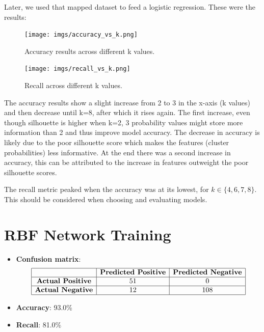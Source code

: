 \documentclass[a4paper,12pt]{article}
\begin{document}
Later, we used that mapped dataset to feed a logistic regression. These were the results:

\begin{figure}[H]
    \centering
    \begin{minipage}{0.48\textwidth}
        \centering
        \texttt{[image: imgs/accuracy\_vs\_k.png]}  %
        \caption{Accuracy results across different k values.}
        \label{fig:silhouette1}
    \end{minipage}
    \hfill
    \begin{minipage}{0.48\textwidth}
        \centering
        \texttt{[image: imgs/recall\_vs\_k.png]}  %
        \caption{Recall across different k values.}
        \label{fig:silhouette2}
    \end{minipage}
\end{figure}


The accuracy results show a slight increase from 2 to 3 in the x-axis (k values) and then decrease until k=8, after which it rises again. The first increase, even though silhouette is higher when k=2, 3 probability values might store more information than 2 and thus improve model accuracy. The decrease in accuracy is likely due to the poor silhouette score which makes the features (cluster probabilities) less informative. At the end there was a second increase in accuracy, this can be attributed to the increase in features outweight the poor silhouette scores.

The recall metric peaked when the accuracy was at its lowest, for \( k \in \{ 4, 6, 7, 8 \} \). This should be considered when choosing and evaluating models.



\section{RBF Network Training}
\label{sec:rbf-network}
\begin{itemize}
    \item \textbf{Confusion matrix}: 
    \[
    \begin{array}{|c|c|c|}
    \hline
    & \textbf{Predicted Positive} & \textbf{Predicted Negative} \\
    \hline
    \textbf{Actual Positive} & 51 & 0 \\
    \hline
    \textbf{Actual Negative} & 12 & 108 \\
    \hline
    \end{array}
    \]
    \item \textbf{Accuracy}: 93.0\%
    \item \textbf{Recall}: 81.0\%

    
\end{itemize}
\end{document}
